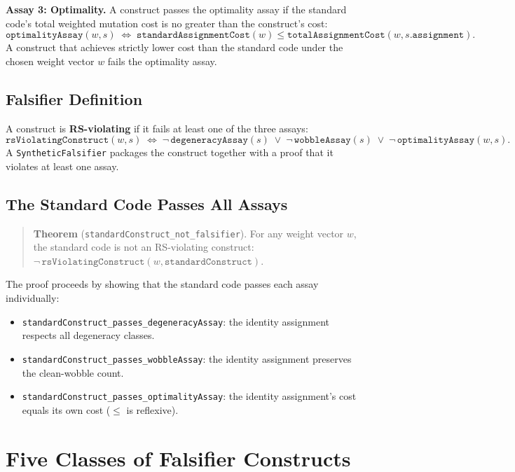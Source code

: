 \documentclass[11pt,twocolumn]{article}
\begin{document}
\textbf{Assay 3: Optimality.}
A construct passes the optimality assay if the standard code's total
weighted mutation cost is no greater than the construct's cost:
\[
  \texttt{optimalityAssay}(w, s) \;\Leftrightarrow\;
  \texttt{standardAssignmentCost}(w) \leq
  \texttt{totalAssignmentCost}(w, s.\texttt{assignment}).
\]
A construct that achieves strictly lower cost than the standard code under
the chosen weight vector $w$ fails the optimality assay.

\subsection{Falsifier Definition}

A construct is \textbf{RS-violating} if it fails at least one of the three
assays:
\[
  \texttt{rsViolatingConstruct}(w, s) \;\Leftrightarrow\;
  \neg\,\texttt{degeneracyAssay}(s) \;\lor\;
  \neg\,\texttt{wobbleAssay}(s) \;\lor\;
  \neg\,\texttt{optimalityAssay}(w, s).
\]
A \texttt{SyntheticFalsifier} packages the construct together with a
proof that it violates at least one assay.

\subsection{The Standard Code Passes All Assays}

\begin{quote}
\textbf{Theorem} (\texttt{standardConstruct\_not\_falsifier}).
For any weight vector $w$, the standard code is not an RS-violating
construct: $\neg\,\texttt{rsViolatingConstruct}(w,
\texttt{standardConstruct})$.
\end{quote}

The proof proceeds by showing that the standard code passes each assay
individually:
\begin{itemize}
\item \texttt{standardConstruct\_passes\_degeneracyAssay}:
  the identity assignment respects all degeneracy classes.
\item \texttt{standardConstruct\_passes\_wobbleAssay}:
  the identity assignment preserves the clean-wobble count.
\item \texttt{standardConstruct\_passes\_optimalityAssay}:
  the identity assignment's cost equals its own cost ($\leq$ is
  reflexive).
\end{itemize}

\section{Five Classes of Falsifier Constructs}
\end{document}
